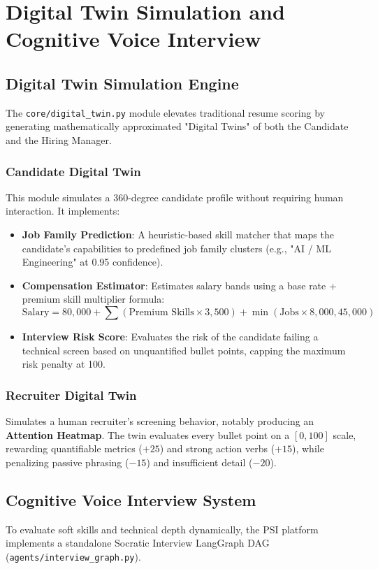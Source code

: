 \documentclass[10pt,journal,compsoc]{IEEEtran}
\begin{document}
\section{Digital Twin Simulation and Cognitive Voice Interview}\label{sec:digital_twin}

\subsection{Digital Twin Simulation Engine}
The \texttt{core/digital\_twin.py} module elevates traditional resume scoring by generating mathematically approximated "Digital Twins" of both the Candidate and the Hiring Manager.

\subsubsection{Candidate Digital Twin}
This module simulates a 360-degree candidate profile without requiring human interaction. It implements:
\begin{itemize}
    \item \textbf{Job Family Prediction}: A heuristic-based skill matcher that maps the candidate's capabilities to predefined job family clusters (e.g., "AI / ML Engineering" at 0.95 confidence).
    \item \textbf{Compensation Estimator}: Estimates salary bands using a base rate + premium skill multiplier formula: 
    \begin{equation}
        \text{Salary} = 80,000 + \sum(\text{Premium Skills} \times 3,500) + \min(\text{Jobs} \times 8,000, 45,000)
    \end{equation}
    \item \textbf{Interview Risk Score}: Evaluates the risk of the candidate failing a technical screen based on unquantified bullet points, capping the maximum risk penalty at 100.
\end{itemize}

\subsubsection{Recruiter Digital Twin}
Simulates a human recruiter's screening behavior, notably producing an \textbf{Attention Heatmap}. The twin evaluates every bullet point on a $[0, 100]$ scale, rewarding quantifiable metrics ($+25$) and strong action verbs ($+15$), while penalizing passive phrasing ($-15$) and insufficient detail ($-20$).

\subsection{Cognitive Voice Interview System}
To evaluate soft skills and technical depth dynamically, the PSI platform implements a standalone Socratic Interview LangGraph DAG (\texttt{agents/interview\_graph.py}).
\end{document}
